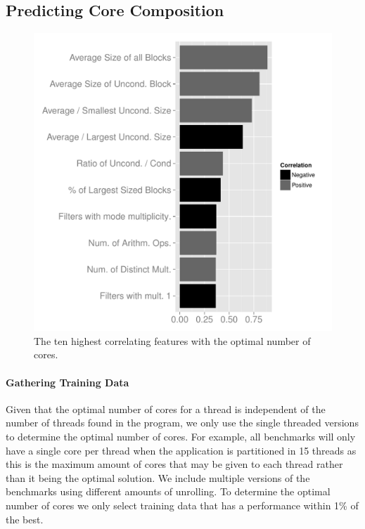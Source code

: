 \subsection{Predicting Core Composition}

\begin{figure}
  \includegraphics[width=1\textwidth]{streamit-paper/graphics/coreCorr.pdf}
  \caption{The ten highest correlating features with the optimal number of cores.}\label{fig:corrCore}
\end{figure}
\paragraph{Gathering Training Data}
Given that the optimal number of cores for a thread is independent of the number of threads found in the program, we only use the single threaded versions to determine the optimal number of cores.
For example, all benchmarks will only have a single core per thread when the application is partitioned in 15 threads as this is the maximum amount of cores that may be given to each thread rather than it being the optimal solution. 
We include multiple versions of the benchmarks using different amounts of unrolling.
To determine the optimal number of cores we only select training data that has a performance within 1\% of the best. 


